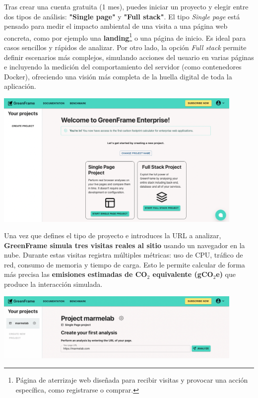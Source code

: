 \documentclass[12pt,a4paper]{report}
\begin{document}
Tras crear una cuenta gratuita (1 mes), puedes iniciar un proyecto y elegir
entre dos tipos de análisis: \textbf{"Single page"} y \textbf{"Full stack"}. El
tipo \textit{Single page} está pensado para medir el impacto ambiental de una
visita a una página web concreta, como por ejemplo una
\textbf{landing}\footnote{Página de aterrizaje web diseñada para recibir
  visitas y provocar una acción específica, como registrarse o comprar.} o una
página de inicio. Es ideal para casos sencillos y rápidos de analizar. Por otro
lado, la opción \textit{Full stack} permite definir escenarios más complejos,
simulando acciones del usuario en varias páginas e incluyendo la medición del
comportamiento del servidor (como contenedores Docker), ofreciendo una visión
más completa de la huella digital de toda la aplicación.

\begin{center}
  \includegraphics[width=0.9\textwidth]{imagenes/Greenframe_2.png}
\end{center}

Una vez que defines el tipo de proyecto e introduces la URL a analizar,
\textbf{GreenFrame simula tres visitas reales al sitio} usando un navegador en
la nube. Durante estas visitas registra múltiples métricas: uso de CPU, tráfico
de red, consumo de memoria y tiempo de carga. Esto le permite calcular de forma
más precisa las \textbf{emisiones estimadas de CO$_2$ equivalente (gCO$_2$e)}
que produce la interacción simulada.

\begin{center}
  \includegraphics[width=0.9\textwidth]{imagenes/Greenframe_3.png}
\end{center}
\end{document}
